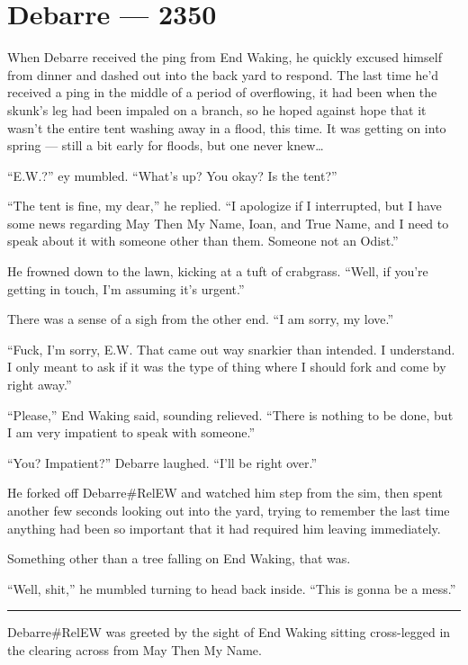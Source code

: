 \hypertarget{debarre-2350}{%
\chapter{Debarre — 2350}\label{debarre-2350}}

When Debarre received the ping from End Waking, he quickly excused himself from dinner and dashed out into the back yard to respond. The last time he'd received a ping in the middle of a period of overflowing, it had been when the skunk's leg had been impaled on a branch, so he hoped against hope that it wasn't the entire tent washing away in a flood, this time. It was getting on into spring — still a bit early for floods, but one never knew\ldots{}

``E.W.?'' ey mumbled. ``What's up? You okay? Is the tent?''

``The tent is fine, my dear,'' he replied. ``I apologize if I interrupted, but I have some news regarding May Then My Name, Ioan, and True Name, and I need to speak about it with someone other than them. Someone not an Odist.''

He frowned down to the lawn, kicking at a tuft of crabgrass. ``Well, if you're getting in touch, I'm assuming it's urgent.''

There was a sense of a sigh from the other end. ``I am sorry, my love.''

``Fuck, I'm sorry, E.W. That came out way snarkier than intended. I understand. I only meant to ask if it was the type of thing where I should fork and come by right away.''

``Please,'' End Waking said, sounding relieved. ``There is nothing to be done, but I am very impatient to speak with someone.''

``You? Impatient?'' Debarre laughed. ``I'll be right over.''

He forked off Debarre\#RelEW and watched him step from the sim, then spent another few seconds looking out into the yard, trying to remember the last time anything had been so important that it had required him leaving immediately.

Something other than a tree falling on End Waking, that was.

``Well, shit,'' he mumbled turning to head back inside. ``This is gonna be a mess.''

\begin{center}\rule{0.5\linewidth}{0.5pt}\end{center}

Debarre\#RelEW was greeted by the sight of End Waking sitting cross-legged in the clearing across from May Then My Name.


